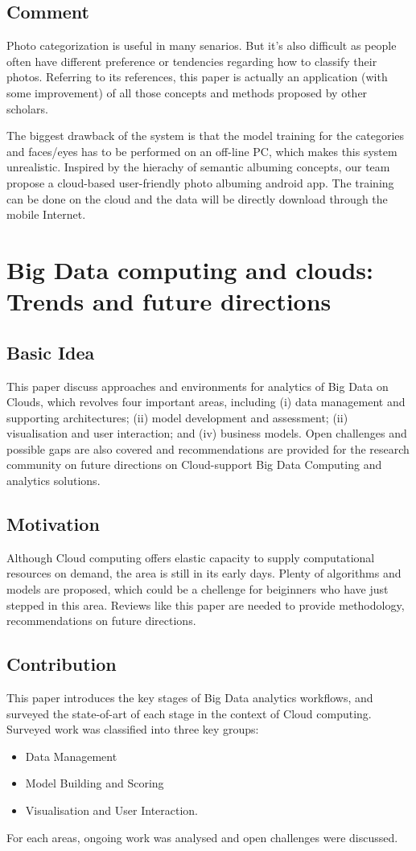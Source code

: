 \documentclass[a4paper]{article}
\begin{document}
        \subsection{Comment}
        Photo categorization is useful in many senarios. But it's also difficult as people often have different preference or tendencies regarding how to classify their photos. Referring to its references, this paper is actually an application (with some improvement) of all those concepts and methods proposed by other scholars.

        The biggest drawback of the system is that the model training for the categories and faces/eyes has to be performed on an off-line PC, which makes this system unrealistic. Inspired by the hierachy of semantic albuming concepts, our team propose a cloud-based user-friendly photo albuming android app. The training can be done on the cloud and the data will be directly download through the mobile Internet.

    \section{Big Data computing and clouds: Trends and future directions}
        \subsection{Basic Idea} 
        This paper discuss approaches and environments for analytics of Big Data on Clouds, which revolves four important areas, including (i) data management and supporting architectures; (ii) model development and assessment; (ii) visualisation and user interaction; and (iv) business models. Open challenges and possible gaps are also covered and recommendations are provided for the research community on future directions on Cloud-support Big Data Computing and analytics solutions.
        \subsection{Motivation}
        Although Cloud computing offers elastic capacity to supply computational resources on demand, the area is still in its early days. Plenty of algorithms and models are proposed, which could be a chellenge for beiginners who have just stepped in this area. Reviews like this paper are needed to provide methodology, recommendations on future directions.
        \subsection{Contribution}
        This paper introduces the key stages of Big Data analytics workflows, and surveyed the state-of-art of each stage in the context of Cloud computing. Surveyed work was classified into three key groups:
        \begin{itemize}
            \item Data Management
            \item Model Building and Scoring
            \item Visualisation and User Interaction. 
        \end{itemize}
        For each areas, ongoing work was analysed and open challenges were discussed.
\end{document}
